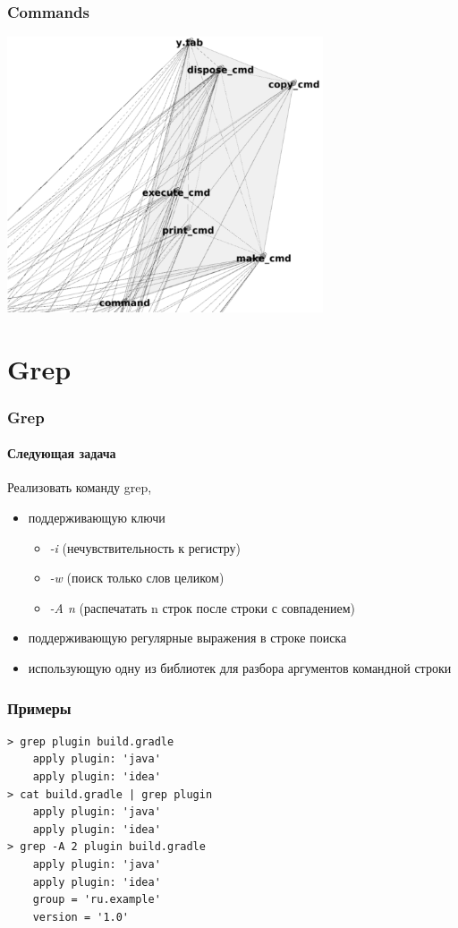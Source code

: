 \documentclass[xetex,mathserif,serif]{beamer}
\begin{document}
	\begin{frame}
		\frametitle{Commands}
		\begin{center}
			\includegraphics[width=0.7\textwidth]{bashCommands.png}
		\end{center}
	\end{frame}

	\section{Grep}

	\begin{frame}
		\frametitle{Grep}
		\framesubtitle{Следующая задача}
		Реализовать команду grep, 
		\begin{itemize}
			\item поддерживающую ключи
			\begin{itemize}
				\item \textit{-i} (нечувствительность к регистру)
				\item \textit{-w} (поиск только слов целиком)
				\item \textit{-A n} (распечатать n строк после строки с совпадением)
			\end{itemize}
			\item поддерживающую регулярные выражения в строке поиска
			\item использующую одну из библиотек для разбора аргументов командной строки
		\end{itemize}
	\end{frame}

	\begin{frame}[fragile]
		\frametitle{Примеры}
		\begin{verbatim}
> grep plugin build.gradle
    apply plugin: 'java'
    apply plugin: 'idea'
> cat build.gradle | grep plugin
    apply plugin: 'java'
    apply plugin: 'idea'
> grep -A 2 plugin build.gradle
    apply plugin: 'java'
    apply plugin: 'idea'
    group = 'ru.example'
    version = '1.0'
		\end{verbatim}
	\end{frame}
\end{document}
